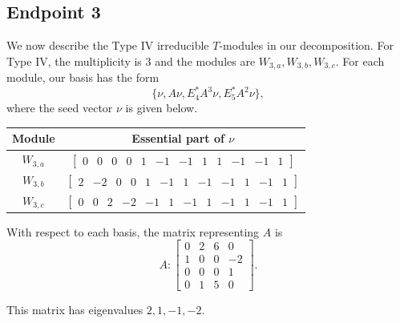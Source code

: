 \documentclass[12pt,letterpaper]{article}
\newcommand{\rowvector}[1]{\begin{bmatrix} #1 \end{bmatrix}}
\begin{document}
\subsection{Endpoint 3}

We now describe the Type IV irreducible $T$-modules in our decomposition. For Type IV, the multiplicity is 3 and the modules are $W_{3,a},W_{3,b},W_{3,c}$. For each module, our basis has the form 
\begin{equation*}
    \{\nu, A\nu, E_4^*A^3\nu, E_5^*A^2\nu\},
\end{equation*} 
where the seed vector $\nu$ is given below.
\begin{center}
    \begin{tabular}{c | c}
    \toprule
       \textbf{Module}  & \textbf {Essential part of }$\nu$ \\
       \midrule
       $W_{3,a}$  & $\rowvector{0 & 0 & 0 & 0 & 1 & -1 & -1 & 1 & 1 & -1 & -1 & 1}$ \\[1.67pt]
       $W_{3,b}$  & $\rowvector{2 & -2 & 0 & 0 & 1 & -1 & 1 & -1 & -1 & 1 & -1 & 1}$ \\[1.67pt]
      $W_{3,c}$  & $\rowvector{0 & 0 & 2 & -2 & -1 & 1 & -1 & 1 & -1 & 1 & -1 & 1}$ \\
    \bottomrule
    \end{tabular}
\end{center}

With respect to each basis, the matrix representing $A$ is 
\begin{equation}
    A: \begin{bmatrix}
  0 & 2 & 6 & 0 \\
  1 & 0 & 0 & -2 \\
  0 & 0 & 0 & 1\\
  0 & 1 & 5 & 0 \end{bmatrix}.
\label{eq:fos-IV}
\end{equation}

This matrix has eigenvalues $2, 1, -1, -2$.
\end{document}
